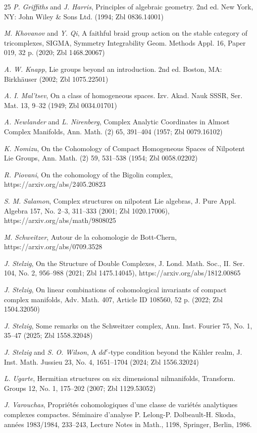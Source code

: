 \documentclass[leqno]{article}
\theoremstyle{definition}
\numberwithin{equation}{section}
\begin{document}
\begin{thebibliography}{25}
\textit{P. Griffiths} and \textit{J. Harris}, Principles of algebraic geometry. 2nd ed. New York, NY: John Wiley \& Sons Ltd. (1994; Zbl 0836.14001)

\textit{M. Khovanov} and \textit{Y. Qi}, A faithful braid group action on the stable category of tricomplexes, SIGMA, Symmetry Integrability Geom. Methods Appl. 16, Paper 019, 32 p. (2020; Zbl 1468.20067)

\textit{A. W. Knapp}, Lie groups beyond an introduction. 2nd ed. Boston, MA: Birkhäuser (2002; Zbl 1075.22501)

\textit{A. I. Mal'tsev}, On a class of homogeneous spaces. Izv. Akad. Nauk SSSR, Ser. Mat. 13, 9--32 (1949; Zbl 0034.01701)

\textit{A. Newlander} and \textit{L. Nirenberg}, Complex Analytic Coordinates in Almost Complex Manifolds, Ann. Math. (2) 65, 391--404 (1957; Zbl 0079.16102)

\textit{K. Nomizu}, On the Cohomology of Compact Homogeneous Spaces of Nilpotent Lie Groups, Ann. Math. (2) 59, 531--538 (1954; Zbl 0058.02202)

\textit{R. Piovani}, On the cohomology of the Bigolin complex,
{\footnotesize\sf https://arxiv.org/abs/2405.20823} 

\textit{S. M. Salamon}, Complex structures on nilpotent Lie algebras, J. Pure Appl. Algebra 157, No. 2--3, 311--333 (2001; Zbl 1020.17006),
{\footnotesize\sf https://arxiv.org/abs/math/9808025} 

\textit{M. Schweitzer}, Autour de la cohomologie de Bott-Chern,
{\footnotesize\sf https://arxiv.org/abs/0709.3528} 

\textit{J. Stelzig}, On the Structure of Double Complexes, J. Lond. Math. Soc., II. Ser. 104, No. 2, 956--988 (2021; Zbl 1475.14045),
{\footnotesize\sf https://arxiv.org/abs/1812.00865}

\textit{J. Stelzig}, On linear combinations of cohomological invariants of compact complex manifolds, Adv. Math. 407, Article ID 108560, 52 p. (2022; Zbl 1504.32050)

\textit{J. Stelzig}, Some remarks on the Schweitzer complex, Ann. Inst. Fourier 75, No. 1, 35--47 (2025; Zbl 1558.32048)

\textit{J. Stelzig} and \textit{S. O. Wilson}, A $dd^c$-type condition beyond the Kähler realm, J. Inst. Math. Jussieu 23, No. 4, 1651--1704 (2024; Zbl 1556.32024)

\textit{L. Ugarte}, Hermitian structures on six dimensional nilmanifolds, Transform. Groups 12, No. 1, 175--202 (2007; Zbl 1129.53052)

\textit{J. Varouchas},
Propriétés cohomologiques d’une classe de variétés analytiques complexes compactes.
Séminaire d’analyse P. Lelong-P. Dolbeault-H. Skoda, années 1983/1984, 233–243, Lecture Notes in Math., 1198, Springer, Berlin, 1986.

\end{thebibliography}
\end{document}
